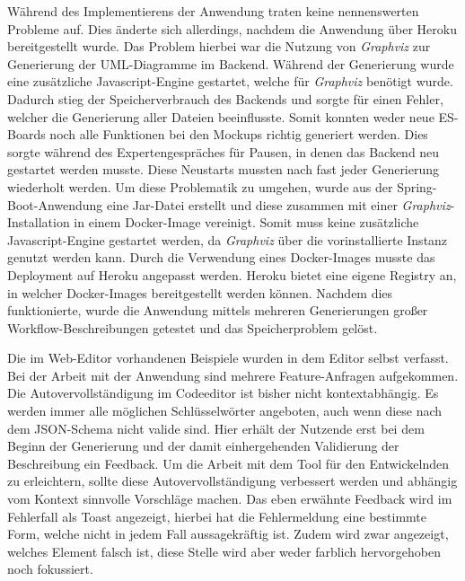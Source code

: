 Während des Implementierens der Anwendung traten keine nennenswerten Probleme auf.
Dies änderte sich allerdings, nachdem die Anwendung über Heroku bereitgestellt wurde.
Das Problem hierbei war die Nutzung von \textit{Graphviz} zur Generierung der UML-Diagramme im Backend.
Während der Generierung wurde eine zusätzliche Javascript-Engine gestartet, welche für \textit{Graphviz} benötigt wurde.
Dadurch stieg der Speicherverbrauch des Backends und sorgte für einen Fehler, welcher die Generierung aller Dateien beeinflusste.
Somit konnten weder neue \ac{ES}-Boards noch alle Funktionen bei den Mockups richtig generiert werden.
Dies sorgte während des Expertengespräches für Pausen, in denen das Backend neu gestartet werden musste.
Diese Neustarts mussten nach fast jeder Generierung wiederholt werden.
Um diese Problematik zu umgehen, wurde aus der Spring-Boot-Anwendung eine Jar-Datei erstellt und diese zusammen mit einer \textit{Graphviz}-Installation in einem Docker-Image
vereinigt\cite*{size-problem}.
Somit muss keine zusätzliche Javascript-Engine gestartet werden, da \textit{Graphviz} über die vorinstallierte Instanz genutzt werden kann.
Durch die Verwendung eines Docker-Images musste das Deployment auf Heroku angepasst werden.
Heroku bietet eine eigene Registry an, in welcher Docker-Images bereitgestellt werden können\cite*{heroku-registry}.
Nachdem dies funktionierte, wurde die Anwendung mittels mehreren Generierungen großer Workflow-Beschreibungen getestet und das Speicherproblem gelöst.

Die im Web-Editor vorhandenen Beispiele wurden in dem Editor selbst verfasst.
Bei der Arbeit mit der Anwendung sind mehrere Feature-Anfragen aufgekommen.
Die Autovervollständigung im Codeeditor ist bisher nicht kontextabhängig.
Es werden immer alle möglichen Schlüsselwörter angeboten, auch wenn diese nach dem JSON-Schema nicht valide sind.
Hier erhält der Nutzende erst bei dem Beginn der Generierung und der damit einhergehenden Validierung der Beschreibung ein Feedback.
Um die Arbeit mit dem Tool für den Entwickelnden zu erleichtern, sollte diese Autovervollständigung verbessert werden und abhängig vom Kontext
sinnvolle Vorschläge machen.
Das eben erwähnte Feedback wird im Fehlerfall als Toast angezeigt, hierbei hat die Fehlermeldung eine bestimmte Form, welche nicht in jedem Fall aussagekräftig ist.
Zudem wird zwar angezeigt, welches Element falsch ist, diese Stelle wird aber weder farblich hervorgehoben noch fokussiert.
